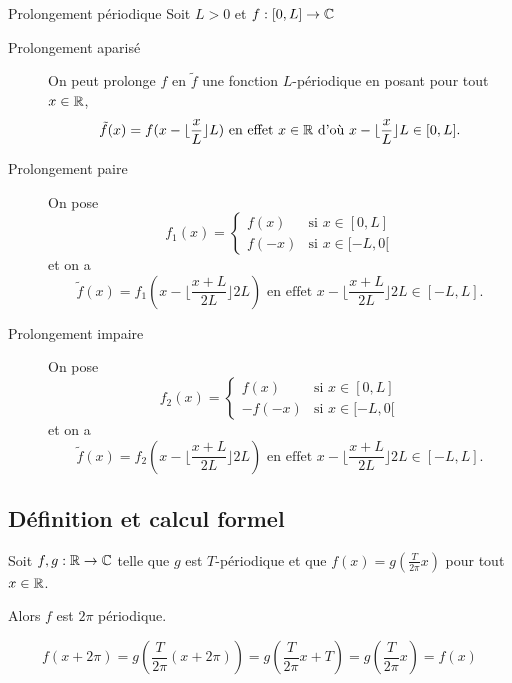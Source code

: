 \documentclass[a4paper,12pt]{article}
\begin{document}
\begin{theoreme}{Prolongement périodique}{}
    Soit $L > 0$ et $f : [0, L] \to \mathbb{C}$

    \begin{description}
        \item[Prolongement aparisé] 
        On peut prolonge $f$ en $\tilde{f}$ une fonction $L$-périodique en posant pour tout $x \in \mathbb{R}$,
        $$
        \tilde{f}(x) = f(x - \lfloor \frac{x}{L} \rfloor L) \text{ en effet } x \in \mathbb{R} \text{ d'où } x - \lfloor \frac{x}{L} \rfloor L \in [0, L].
        $$

        \item[Prolongement paire]
        On pose
        $$
        f_1(x) = \begin{cases}
            f(x) & \text{si } x \in [0, L] \\
            f(-x) & \text{si } x \in [-L, 0[
        \end{cases}
        $$
        et on a
        $$
        \tilde{f}(x) = f_1(x - \lfloor \frac{x + L}{2L} \rfloor 2L) \text{ en effet } x - \lfloor \frac{x + L}{2L} \rfloor 2L \in [-L, L].
        $$

        \item[Prolongement impaire]
        On pose
        $$
        f_2(x) = \begin{cases}
            f(x) & \text{si } x \in [0, L] \\
            -f(-x) & \text{si } x \in [-L, 0[
        \end{cases}
        $$
        et on a
        $$
        \tilde{f}(x) = f_2(x - \lfloor \frac{x + L}{2L} \rfloor 2L) \text{ en effet } x - \lfloor \frac{x + L}{2L} \rfloor 2L \in [-L, L].
        $$
    \end{description}
\end{theoreme}

\subsection{Définition et calcul formel}

\begin{proposition}{}{}
    Soit $f, g : \mathbb{R} \to \mathbb{C}$ telle que $g$ est $T$-périodique et que $f(x) = g(\frac{T}{2\pi} x)$ pour tout $x \in \mathbb{R}$.

    Alors $f$ est $2\pi$ périodique.
\end{proposition}

\begin{demonstration}
    $$
    f(x + 2\pi) = g(\frac{T}{2\pi} (x + 2\pi)) = g(\frac{T}{2\pi} x + T) = g(\frac{T}{2\pi} x) = f(x)
    $$
\end{demonstration}
\end{document}
